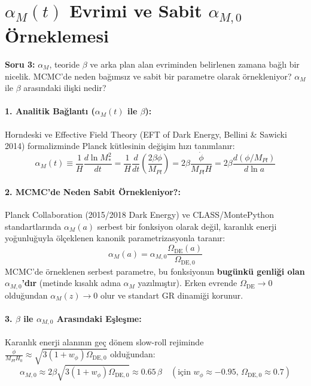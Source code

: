 \documentclass[11pt,a4paper]{article}
\begin{document}
\section{$\alpha_M(t)$ Evrimi ve Sabit $\alpha_{M,0}$ Örneklemesi}

\begin{questionbox}
\textbf{Soru 3:} $\alpha_M$, teoride $\beta$ ve arka plan alan evriminden belirlenen zamana bağlı bir nicelik. MCMC’de neden bağımsız ve sabit bir parametre olarak örnekleniyor? $\alpha_M$ ile $\beta$ arasındaki ilişki nedir?
\end{questionbox}

\paragraph{1. Analitik Bağlantı ($\alpha_M(t)$ ile $\beta$):}
Horndeski ve Effective Field Theory (EFT of Dark Energy, Bellini \& Sawicki 2014) formalizminde Planck kütlesinin değişim hızı tanımlanır:
\begin{equation}
\alpha_M(t) \equiv \frac{1}{H} \frac{d\ln M_*^2}{dt} = \frac{1}{H} \frac{d}{dt}\left(\frac{2\beta\phi}{M_{Pl}}\right) = 2\beta \frac{\dot{\phi}}{M_{Pl} H} = 2\beta \frac{d(\phi/M_{Pl})}{d\ln a}
\end{equation}

\paragraph{2. MCMC'de Neden Sabit Örnekleniyor?:}
Planck Collaboration (2015/2018 Dark Energy) ve CLASS/MontePython standartlarında $\alpha_M(a)$ serbest bir fonksiyon olarak değil, karanlık enerji yoğunluğuyla ölçeklenen kanonik parametrizasyonla taranır:
\begin{equation}
\alpha_M(a) = \alpha_{M,0} \frac{\Omega_{\text{DE}}(a)}{\Omega_{\text{DE},0}}
\end{equation}
MCMC'de örneklenen serbest parametre, bu fonksiyonun \textbf{bugünkü genliği olan $\alpha_{M,0}$'dır} (metinde kısalık adına $\alpha_M$ yazılmıştır). Erken evrende $\Omega_{\text{DE}} \to 0$ olduğundan $\alpha_M(z) \to 0$ olur ve standart GR dinamiği korunur.

\paragraph{3. $\beta$ ile $\alpha_{M,0}$ Arasındaki Eşleşme:}
Karanlık enerji alanının geç dönem slow-roll rejiminde $\frac{\dot{\phi}}{M_{Pl} H_0} \approx \sqrt{3(1 + w_\phi)\Omega_{\text{DE},0}}$ olduğundan:
\begin{equation}
\alpha_{M,0} \approx 2\beta \sqrt{3(1 + w_\phi)\Omega_{\text{DE},0}} \approx 0.65 \, \beta \quad (\text{için } w_\phi \approx -0.95, \, \Omega_{\text{DE},0} \approx 0.7)
\end{equation}
\end{document}
